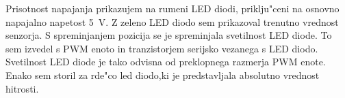 \documentclass[a4paper]{article}
\begin{document}
Prisotnost napajanja prikazujem na rumeni LED diodi, priklju"ceni na osnovno napajalno napetost 5~V. Z zeleno LED diodo sem prikazoval trenutno vrednost senzorja. S spreminjanjem pozicija se je spreminjala svetilnost LED diode. To sem izvedel s PWM enoto in tranzistorjem serijsko vezanega s LED diodo. Svetilnost LED diode je tako odvisna od preklopnega razmerja PWM enote. Enako sem storil za rde"co led diodo,ki je predstavljala absolutno vrednost hitrosti.


%
%
%
%
%
%
%
\end{document}
